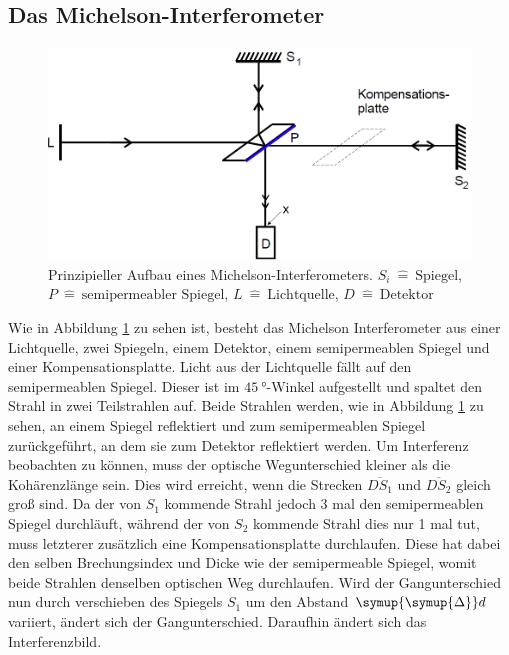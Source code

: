 \subsection{Das Michelson-Interferometer} \label{sec:MIF}
\begin{figure}[H]
  \centering
  \includegraphics[scale=0.55]{Text/Bilder/schematischerAufbau.png}
  \caption{Prinzipieller Aufbau eines Michelson-Interferometers.
  $S_i \: \hat{=} \: \text{Spiegel}$, $P \: \hat{=} \: \text{semipermeabler Spiegel}$, $L \: \hat{=} \: \text{Lichtquelle}$, $D \: \hat{=} \: \text{Detektor}$ \cite[]{sample}}
  \label{fig:SA}
\end{figure}
Wie in Abbildung \ref{fig:SA} zu sehen ist, besteht das Michelson Interferometer aus einer Lichtquelle, zwei Spiegeln, einem Detektor, einem semipermeablen Spiegel und einer
Kompensationsplatte.
Licht aus der Lichtquelle fällt auf den semipermeablen Spiegel. Dieser ist im $\SI{45}{°}$-Winkel aufgestellt und spaltet den Strahl in zwei %
 Teilstrahlen auf.  Beide Strahlen werden, wie in Abbildung \ref{fig:SA} zu sehen, an einem Spiegel reflektiert und zum semipermeablen Spiegel zurückgeführt, an dem sie zum Detektor
reflektiert werden.
Um Interferenz beobachten zu können, muss der optische Wegunterschied kleiner als die Kohärenzlänge sein. Dies wird erreicht, wenn die Strecken $\overline{DS_1}$ und $\overline{DS_2}$ gleich groß sind.
Da der von $S_1$ kommende Strahl jedoch 3 mal den semipermeablen Spiegel durchläuft, während der von $S_2$ kommende Strahl dies nur 1 mal tut, muss letzterer zusätzlich eine Kompensationsplatte durchlaufen.
Diese hat dabei den selben Brechungsindex und Dicke wie der semipermeable Spiegel, womit beide Strahlen denselben optischen Weg durchlaufen.
Wird der Gangunterschied nun durch verschieben des Spiegels $S_1$ um den Abstand $\symup{\symup{\Delta}}d$  variiert, ändert sich der Gangunterschied. Daraufhin ändert sich das Interferenzbild.
